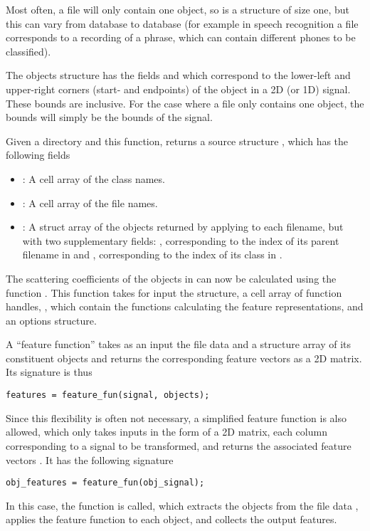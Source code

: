 \documentclass[twocolumn]{article}
\begin{document}
Most often, a file will only contain one object, so  is a  structure of size one, but this can vary from database to database (for example in speech recognition a file corresponds to a recording of a phrase, which can contain different phones to be classified).

The objects structure has the fields  and  which correspond to the lower-left and upper-right corners (start- and endpoints) of the object in a 2D (or 1D) signal. These bounds are inclusive. For the case where a file only contains one object, the bounds will simply be the bounds of the signal.

Given a directory and this function,  returns a source structure , which has the following fields
\begin{itemize}
	\item {}: A cell array of the class names.
	\item {}: A cell array of the file names.
	\item {}: A struct array of the objects returned by applying  to each filename, but with two supplementary fields: , corresponding to the index of its parent filename in  and , corresponding to the index of its class in .
\end{itemize}

The scattering coefficients of the objects in  can now be calculated using the function . This function takes for input the  structure, a cell array of function handles, , which contain the functions calculating the feature representations, and an options structure.

A ``feature function'' takes as an input the file data and a structure array of its constituent objects and returns the corresponding feature vectors as a 2D matrix. Its signature is thus
\begin{lstlisting}
features = feature_fun(signal, objects);
\end{lstlisting}
Since this flexibility is often not necessary, a simplified feature function is also allowed, which only takes inputs  in the form of a 2D matrix, each column corresponding to a signal to be transformed, and returns the associated feature vectors . It has the following signature
\begin{lstlisting}
obj_features = feature_fun(obj_signal);
\end{lstlisting}
In this case, the function  is called, which extracts the objects from the file data , applies the feature function to each object, and collects the output features.
\end{document}
